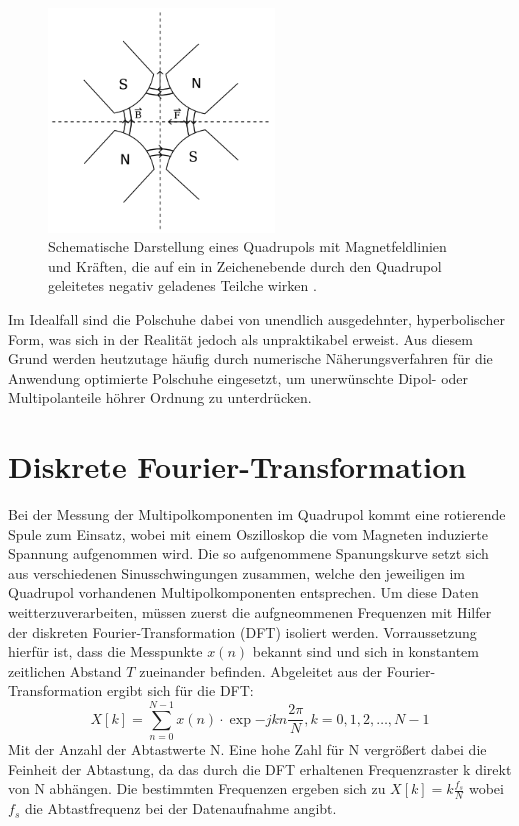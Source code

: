 \documentclass[bigchapter,colorback,accentcolor=tud4b,linedtoc,11pt]{tudreport}
\begin{document}
\begin{figure}[H]
\centering
\includegraphics[width=60mm]{img/quadrupol.png}
\caption{Schematische Darstellung eines Quadrupols mit Magnetfeldlinien und Kräften, die auf ein in Zeichenebende durch den Quadrupol geleitetes negativ geladenes Teilche wirken \cite{anleitung}.}
\end{figure}

Im Idealfall sind die Polschuhe dabei von unendlich ausgedehnter, hyperbolischer Form, was sich in der Realität jedoch als unpraktikabel erweist. Aus diesem Grund werden heutzutage häufig durch numerische Näherungsverfahren für die Anwendung optimierte Polschuhe eingesetzt, um unerwünschte Dipol- oder Multipolanteile höhrer Ordnung zu unterdrücken. 

\section{Diskrete Fourier-Transformation}
Bei der Messung der Multipolkomponenten im Quadrupol kommt eine rotierende Spule zum Einsatz, wobei mit einem Oszilloskop die vom Magneten induzierte Spannung aufgenommen wird. Die so aufgenommene Spanungskurve setzt sich aus verschiedenen Sinusschwingungen zusammen, welche den jeweiligen im Quadrupol vorhandenen Multipolkomponenten entsprechen. Um diese Daten weitterzuverarbeiten, müssen zuerst die aufgneommenen Frequenzen mit Hilfer der diskreten Fourier-Transformation (DFT) isoliert werden. Vorraussetzung hierfür ist, dass die Messpunkte $x(n)$ bekannt sind und sich in konstantem zeitlichen Abstand $T$ zueinander befinden. Abgeleitet aus der Fourier-Transformation ergibt sich für die DFT:
$$X[k]= \sum_{n=0}^{N-1} x\left( n \right) \cdot \exp{-jkn \frac{2\pi}{N}}, k = 0, 1, 2, \dots, N-1$$
Mit der Anzahl der Abtastwerte N. Eine hohe Zahl für N vergrößert dabei die Feinheit der Abtastung, da das durch die DFT erhaltenen Frequenzraster k direkt von N abhängen. Die bestimmten Frequenzen ergeben sich zu 
$X[k]=k\frac{f_s}{N}$
wobei $f_s$ die Abtastfrequenz bei der Datenaufnahme angibt.
\end{document}
